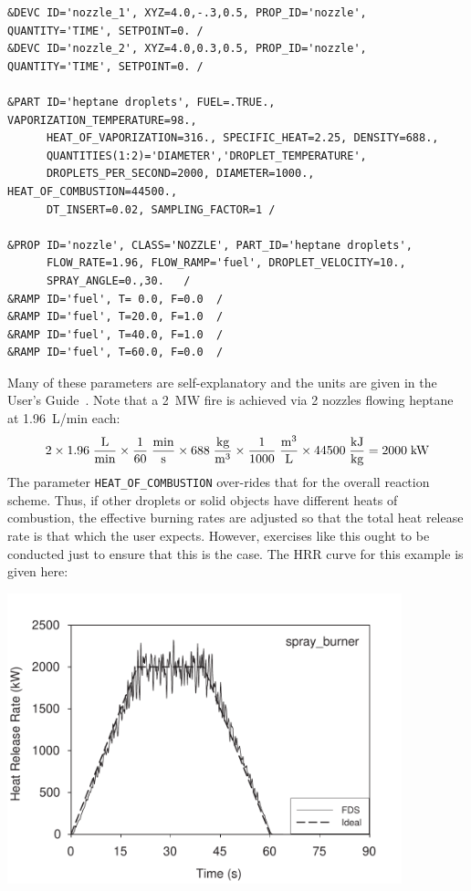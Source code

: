 \documentclass[11pt]{book}
\newcommand{\ct}{\tt\small}
\newcommand{\be}{\begin{equation}}
\newcommand{\ee}{\end{equation}}
\begin{document}
\footnotesize
\begin{verbatim}
&DEVC ID='nozzle_1', XYZ=4.0,-.3,0.5, PROP_ID='nozzle', QUANTITY='TIME', SETPOINT=0. /
&DEVC ID='nozzle_2', XYZ=4.0,0.3,0.5, PROP_ID='nozzle', QUANTITY='TIME', SETPOINT=0. /

&PART ID='heptane droplets', FUEL=.TRUE., VAPORIZATION_TEMPERATURE=98.,
      HEAT_OF_VAPORIZATION=316., SPECIFIC_HEAT=2.25, DENSITY=688.,
      QUANTITIES(1:2)='DIAMETER','DROPLET_TEMPERATURE',
      DROPLETS_PER_SECOND=2000, DIAMETER=1000., HEAT_OF_COMBUSTION=44500.,
      DT_INSERT=0.02, SAMPLING_FACTOR=1 /

&PROP ID='nozzle', CLASS='NOZZLE', PART_ID='heptane droplets',
      FLOW_RATE=1.96, FLOW_RAMP='fuel', DROPLET_VELOCITY=10.,
      SPRAY_ANGLE=0.,30.   /
&RAMP ID='fuel', T= 0.0, F=0.0  /
&RAMP ID='fuel', T=20.0, F=1.0  /
&RAMP ID='fuel', T=40.0, F=1.0  /
&RAMP ID='fuel', T=60.0, F=0.0  /
\end{verbatim}
\normalsize
Many of these parameters are self-explanatory and the
units are given in the User's Guide~\cite{FDS_Users_Guide_5}. Note
that a 2~MW fire is achieved via 2 nozzles flowing heptane at
1.96~L/min each:
\be 2 \times 1.96 \; \frac{\hbox{L}}{\hbox{min}} \times \frac{1}{60} \; \frac{\hbox{min}}{\hbox{s}} \times 688 \;
\frac{\hbox{kg}}{\hbox{m}^3} \times \frac{1}{1000} \; \frac{\hbox{m}^3}{\hbox{L}} \times 44500 \;
\frac{\hbox{kJ}}{\hbox{kg}} = 2000 \; \hbox{kW} \ee
The parameter {\ct HEAT\_OF\_COMBUSTION} over-rides that for the overall reaction scheme. Thus, if other droplets
or solid objects have different heats of combustion, the effective burning rates are adjusted so that the
total heat release rate is that which the user expects. However, exercises like this ought to be conducted just to
ensure that this is the case. The HRR curve for this example is given here:

\begin{center}
\includegraphics[width=4.5in]{FIGURES/spray_burner_HRR}
\end{center}
\end{document}
